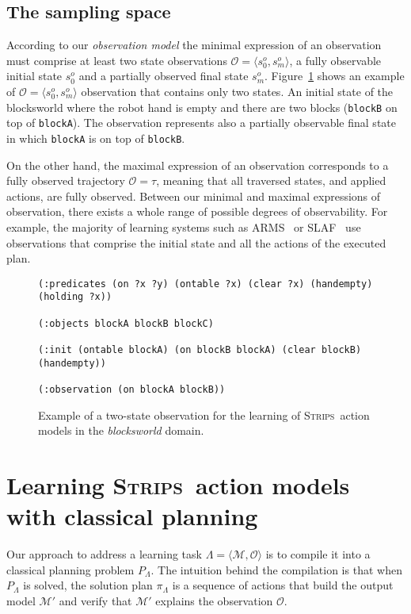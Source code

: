 \documentclass[runningheads]{llncs}
\newcommand{\tup}[1]{{\langle #1 \rangle}}
\newcommand{\strips}{\textsc{Strips}}     %
\begin{document}
\subsection{The sampling space}
According to our {\em observation model} the minimal expression of an observation must comprise at least two state observations $\mathcal{O}=\tup{s_0^o,s_m^o}$, a fully observable initial state $s_0^o$ and a partially observed final state $s_m^o$. Figure~\ref{fig:observation} shows an example of $\mathcal{O}=\tup{s_0^o,s_m^o}$ observation that contains only two states. An initial state of the blocksworld where the robot hand is empty and there are two blocks ({\tt\small{blockB}} on top of  {\tt\small{blockA}}). The observation represents also a partially observable final state in which {\tt\small{blockA}} is on top of {\tt\small{blockB}}.

On the other hand, the maximal expression of an observation corresponds to a fully observed trajectory $\mathcal{O}=\tau$, meaning that all traversed states, and applied actions, are fully observed. Between our minimal and maximal expressions of observation, there exists a whole range of possible degrees of observability. For example, the majority of learning systems such as {\sc ARMS}~\cite{yang2007learning} or {\sc SLAF}~\cite{amir:alearning:JAIR08} use observations that comprise the initial state and all the actions of the executed plan.


\begin{figure}[hbt!]
  \begin{small}
  \begin{verbatim}
(:predicates (on ?x ?y) (ontable ?x) (clear ?x) (handempty) (holding ?x))

(:objects blockA blockB blockC)

(:init (ontable blockA) (on blockB blockA) (clear blockB) (handempty))

(:observation (on blockA blockB))
  \end{verbatim}
  \end{small}
	\caption{\small Example of a two-state observation for the learning of \strips\ action models in the {\em blocksworld} domain.}
	\label{fig:observation}
\end{figure}



\section{Learning \strips\ action models with classical planning}
Our approach to address a learning task $\Lambda=\tup{\mathcal{M},{\mathcal O}}$ is to compile it into a classical planning problem $P_{\Lambda}$. The intuition behind the compilation is that when $P_{\Lambda}$ is solved, the solution plan $\pi_\Lambda$ is a sequence of actions that build the output model $\mathcal{M'}$ and verify that $\mathcal{M'}$ explains the observation ${\mathcal O}$.
\end{document}
